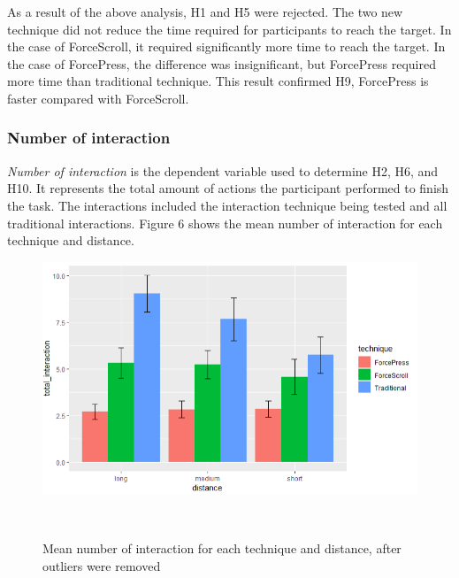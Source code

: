 \documentclass{sigchi}
\begin{document}
As a result of the above analysis, H1 and H5 were rejected. The two new technique did not reduce the time required for participants to reach the target. In the case of ForceScroll, it required significantly more time to reach the target. In the case of ForcePress, the difference was insignificant, but ForcePress required more time than traditional technique. This result confirmed H9, ForcePress is faster compared with ForceScroll.


\subsubsection{Number of interaction}
\textit{Number of interaction} is the dependent variable used to determine H2, H6, and H10. It represents the total amount of actions the participant performed to finish the task. The interactions included the interaction technique being tested and all traditional interactions. Figure 6 shows the mean number of interaction for each technique and distance. 
\begin{figure}[!h]
    \centering
    \includegraphics[width=0.8\columnwidth]{figures/figure5}
    \caption{Mean number of interaction for each technique and distance, after outliers were removed}~\label{fig:figure6}
\end{figure}
\end{document}
